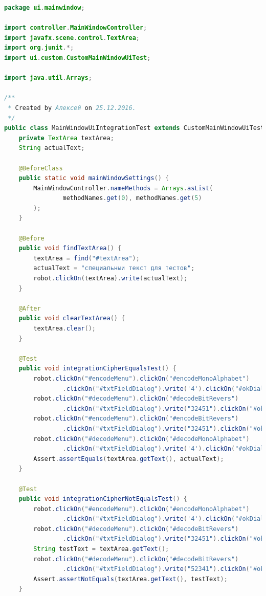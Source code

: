 \documentclass[a4paper,12pt]{article}
\begin{document}
\newpage
\begin{lstlisting}[language=java, caption=код модуля MainWindowUiIntegrationTest.java]
package ui.mainwindow;

import controller.MainWindowController;
import javafx.scene.control.TextArea;
import org.junit.*;
import ui.custom.CustomMainWindowUiTest;

import java.util.Arrays;

/**
 * Created by Алексей on 25.12.2016.
 */
public class MainWindowUiIntegrationTest extends CustomMainWindowUiTest {
    private TextArea textArea;
    String actualText;

    @BeforeClass
    public static void mainWindowSettings() {
        MainWindowController.nameMethods = Arrays.asList(
                methodNames.get(0), methodNames.get(5)
        );
    }

    @Before
    public void findTextArea() {
        textArea = find("#textArea");
        actualText = "специальныи текст для тестов";
        robot.clickOn(textArea).write(actualText);
    }

    @After
    public void clearTextArea() {
        textArea.clear();
    }

    @Test
    public void integrationCipherEqualsTest() {
        robot.clickOn("#encodeMenu").clickOn("#encodeMonoAlphabet")
                .clickOn("#txtFieldDialog").write('4').clickOn("#okDialog");
        robot.clickOn("#decodeMenu").clickOn("#decodeBitRevers")
                .clickOn("#txtFieldDialog").write("32451").clickOn("#okDialog");
        robot.clickOn("#encodeMenu").clickOn("#encodeBitRevers")
                .clickOn("#txtFieldDialog").write("32451").clickOn("#okDialog");
        robot.clickOn("#decodeMenu").clickOn("#decodeMonoAlphabet")
                .clickOn("#txtFieldDialog").write('4').clickOn("#okDialog");
        Assert.assertEquals(textArea.getText(), actualText);
    }

    @Test
    public void integrationCipherNotEqualsTest() {
        robot.clickOn("#encodeMenu").clickOn("#encodeMonoAlphabet")
                .clickOn("#txtFieldDialog").write('4').clickOn("#okDialog");
        robot.clickOn("#decodeMenu").clickOn("#decodeBitRevers")
                .clickOn("#txtFieldDialog").write("32451").clickOn("#okDialog");
        String testText = textArea.getText();
        robot.clickOn("#decodeMenu").clickOn("#decodeBitRevers")
                .clickOn("#txtFieldDialog").write("52341").clickOn("#okDialog");
        Assert.assertNotEquals(textArea.getText(), testText);
    }


\end{lstlisting}
\end{document}

